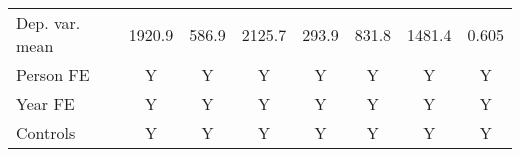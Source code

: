 {\begin{tabular}{l*{7}{c}}
Dep. var. mean      &      1920.9         &       586.9         &      2125.7         &       293.9         &       831.8         &      1481.4         &       0.605         \\
Person FE           &           Y         &           Y         &           Y         &           Y         &           Y         &           Y         &           Y         \\
Year FE             &           Y         &           Y         &           Y         &           Y         &           Y         &           Y         &           Y         \\
Controls            &           Y         &           Y         &           Y         &           Y         &           Y         &           Y         &           Y         \\
\bottomrule
\end{tabular}
}
